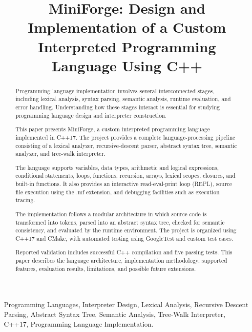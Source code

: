 \documentclass[conference]{IEEEtran}
\title{MiniForge: Design and Implementation of a Custom Interpreted Programming Language Using C++}
\author{
\IEEEauthorblockN{Chethana Sri}
\IEEEauthorblockA{
Department of Computer Technology\\
Madras Institute of Technology, Anna University\\
Chennai, India
}
}
\begin{document}
\maketitle

\begin{abstract}

Programming language implementation involves several
interconnected stages, including lexical analysis,
syntax parsing, semantic analysis, runtime evaluation,
and error handling. Understanding how these stages
interact is essential for studying programming language
design and interpreter construction.

This paper presents MiniForge, a custom interpreted
programming language implemented in C++17. The project
provides a complete language-processing pipeline
consisting of a lexical analyzer, recursive-descent
parser, abstract syntax tree, semantic analyzer,
and tree-walk interpreter.

The language supports variables, data types, arithmetic
and logical expressions, conditional statements,
loops, functions, recursion, arrays, lexical scopes,
closures, and built-in functions. It also provides
an interactive read-eval-print loop (REPL), source
file execution using the .mf extension, and debugging
facilities such as execution tracing.

The implementation follows a modular architecture
in which source code is transformed into tokens,
parsed into an abstract syntax tree, checked for
semantic consistency, and evaluated by the runtime
environment. The project is organized using C++17
and CMake, with automated testing using GoogleTest
and custom test cases.

Reported validation includes successful C++ compilation
and five passing tests. This paper describes the
language architecture, implementation methodology,
supported features, evaluation results, limitations,
and possible future extensions.

\end{abstract}

\begin{IEEEkeywords}
Programming Languages, Interpreter Design, Lexical
Analysis, Recursive Descent Parsing, Abstract Syntax
Tree, Semantic Analysis, Tree-Walk Interpreter,
C++17, Programming Language Implementation.
\end{IEEEkeywords}

\end{document}
